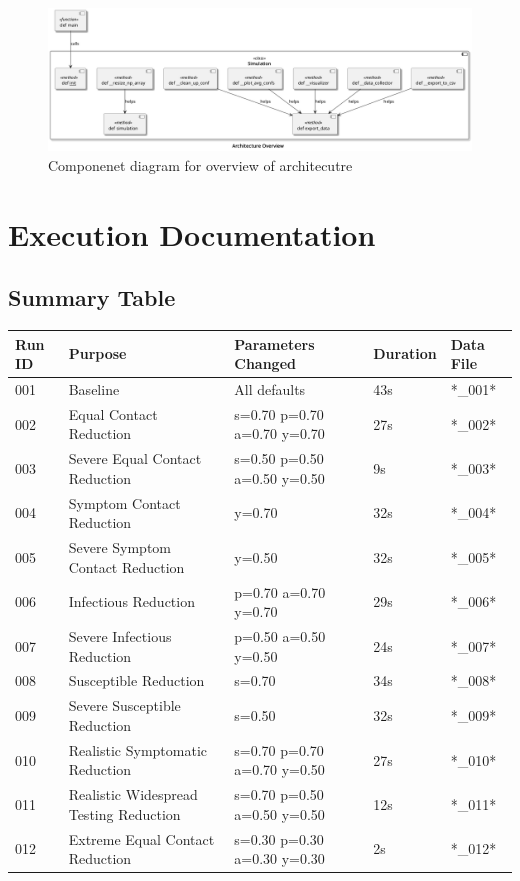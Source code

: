 \documentclass{article}
\begin{document}
\begin{figure}[H]
	\includegraphics[scale=0.3]{B-1.png}
	\caption{Componenet diagram for overview of architecutre}
\end{figure}

\section{Execution Documentation}
\subsection{Summary Table}

\begin{tabular}{|l | l | l | l | l |}
	\hline
	Run ID & Purpose                                & Parameters Changed          & Duration & Data File \\ [0.5ex]
	\hline\hline
	001    & Baseline                               & All defaults                & 43s      & *\_001*   \\
	\hline
	002    & Equal Contact Reduction                & s=0.70 p=0.70 a=0.70 y=0.70 & 27s      & *\_002*   \\
	\hline
	003    & Severe Equal Contact Reduction         & s=0.50 p=0.50 a=0.50 y=0.50 & 9s       & *\_003*   \\
	\hline
	004    & Symptom Contact Reduction              & y=0.70                      & 32s      & *\_004*   \\
	\hline
	005    & Severe Symptom Contact Reduction       & y=0.50                      & 32s      & *\_005*   \\
	\hline
	006    & Infectious Reduction                   & p=0.70 a=0.70 y=0.70        & 29s      & *\_006*   \\
	\hline
	007    & Severe Infectious Reduction            & p=0.50 a=0.50 y=0.50        & 24s      & *\_007*   \\
	\hline
	008    & Susceptible Reduction                  & s=0.70                      & 34s      & *\_008*   \\
	\hline
	009    & Severe Susceptible Reduction           & s=0.50                      & 32s      & *\_009*   \\
	\hline
	010    & Realistic Symptomatic Reduction        & s=0.70 p=0.70 a=0.70 y=0.50 & 27s      & *\_010*   \\
	\hline
	011    & Realistic Widespread Testing Reduction & s=0.70 p=0.50 a=0.50 y=0.50 & 12s      & *\_011*   \\
	\hline
	012    & Extreme Equal Contact Reduction        & s=0.30 p=0.30 a=0.30 y=0.30 & 2s       & *\_012*   \\
	\hline\hline
\end{tabular}
\end{document}
